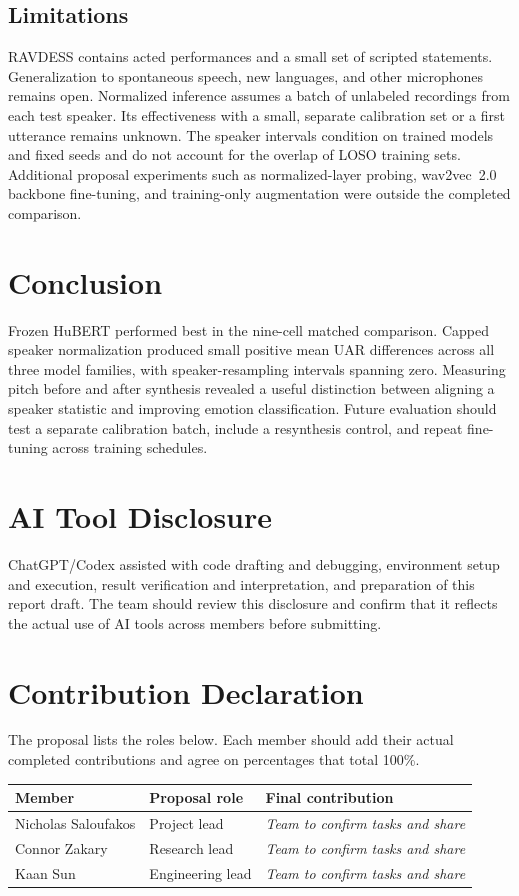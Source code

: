 \documentclass[11pt, letterpaper]{article}
\begin{document}
\subsection{Limitations}
RAVDESS contains acted performances and a small set of scripted statements. Generalization to spontaneous speech, new languages, and other microphones remains open. Normalized inference assumes a batch of unlabeled recordings from each test speaker. Its effectiveness with a small, separate calibration set or a first utterance remains unknown. The speaker intervals condition on trained models and fixed seeds and do not account for the overlap of LOSO training sets. Additional proposal experiments such as normalized-layer probing, wav2vec~2.0 backbone fine-tuning, and training-only augmentation were outside the completed comparison.

\section{Conclusion}
Frozen HuBERT performed best in the nine-cell matched comparison. Capped speaker normalization produced small positive mean UAR differences across all three model families, with speaker-resampling intervals spanning zero. Measuring pitch before and after synthesis revealed a useful distinction between aligning a speaker statistic and improving emotion classification. Future evaluation should test a separate calibration batch, include a resynthesis control, and repeat fine-tuning across training schedules.

\section{AI Tool Disclosure}
ChatGPT/Codex assisted with code drafting and debugging, environment setup and execution, result verification and interpretation, and preparation of this report draft. The team should review this disclosure and confirm that it reflects the actual use of AI tools across members before submitting.

\section{Contribution Declaration}
The proposal lists the roles below. Each member should add their actual completed contributions and agree on percentages that total 100\%.
\begin{center}
\small
\begin{tabular}{@{}lll@{}}
\toprule
Member & Proposal role & Final contribution \\
\midrule
Nicholas Saloufakos & Project lead & \textit{Team to confirm tasks and share} \\
Connor Zakary & Research lead & \textit{Team to confirm tasks and share} \\
Kaan Sun & Engineering lead & \textit{Team to confirm tasks and share} \\
\bottomrule
\end{tabular}
\end{center}
\end{document}
